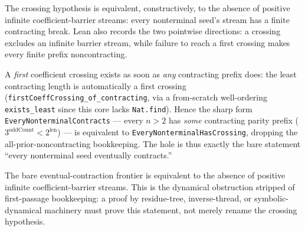 \begin{theorem}
  \label{thm:collatz-crossing-no-infinite-stream}
  \leanok
  The crossing hypothesis is equivalent, constructively, to the absence of positive infinite
  coefficient-barrier streams: every nonterminal seed's stream has a finite contracting break.
  Lean also records the two pointwise directions: a crossing excludes an infinite barrier stream,
  while failure to reach a first crossing makes every finite prefix noncontracting.
\end{theorem}
\begin{theorem}
  \label{thm:collatz-crossing-reduces}
  \leanok
  A \emph{first} coefficient crossing exists as soon as \emph{any} contracting prefix does: the
  least contracting length is automatically a first crossing (\texttt{firstCoeffCrossing\_of\_contracting},
  via a from-scratch well-ordering \texttt{exists\_least} since this core lacks \texttt{Nat.find}).
  Hence the sharp form \texttt{EveryNonterminalContracts} --- every $n>2$ has \emph{some}
  contracting parity prefix ($3^{\mathrm{oddCount}}<2^{\mathrm{len}}$) --- is equivalent to
  \texttt{EveryNonterminalHasCrossing}, dropping the all-prior-noncontracting bookkeeping. The hole
  is thus exactly the bare statement ``every nonterminal seed eventually contracts.''
\end{theorem}
\begin{theorem}
  \label{thm:collatz-eventual-contracts-no-infinite-stream}
  \leanok
  The bare eventual-contraction frontier is equivalent to the absence of positive infinite
  coefficient-barrier streams. This is the dynamical obstruction stripped of first-passage
  bookkeeping: a proof by residue-tree, inverse-thread, or symbolic-dynamical machinery must
  prove this statement, not merely rename the crossing hypothesis.
\end{theorem}
